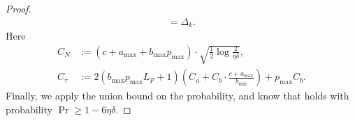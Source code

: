 \begin{proof}
\begin{equation}
\begin{aligned}
            =\Delta_k.
        \end{aligned}
    \end{equation}
    Here 
    \begin{equation}
        \label{eq:def_c_n_c_tau}
        \begin{aligned}
            C_N&:=(c+a_{\max} + b_{\max}p_{\max})\cdot\sqrt{\frac12\log\frac2{\eta\delta}},\\
            C_{\tau}&:=2(b_{\max}p_{\max}L_F + 1)(C_a + C_b\cdot\frac{c+a_{\max}}{b_{\min}}) + p_{\max}C_b.
        \end{aligned}
    \end{equation}
    Finally, we apply the union bound on the probability, and know that  holds with probability $\Pr\geq 1- 6\eta\delta$.
\end{proof}